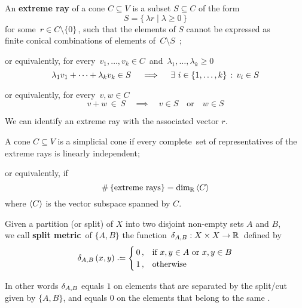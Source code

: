\documentclass[./main.tex]{subfiles}
\begin{document}
\begin{definition}
    An \textbf{extreme ray} of a cone $C \subseteq V$ is a subset $S \subseteq C$ of the form
    \[ S = \{\, \lambda r \mathrel{|} \lambda \geq 0 \,\} \]
    for some $\, r \in C \setminus \{0\} \,$, such that the elements of $S$ cannot be expressed as \\
    finite conical combinations of elements of $\, C \setminus S \,$ ;
    
    or equivalently, for every $\, v_1, \dots, v_k \in C \,$ and $\, \lambda_1, \dots, \lambda_k \geq 0 \,$
    \[ \lambda_1 v_1 + \dots + \lambda_k v_k \in S \quad \implies \quad \exists\ i \in \{ 1, \dots, k \} \,:\, v_i \in S \nospblw \]
    
    or equivalently, for every $\, v,w \in C \,$
    \[ v + w \,\in\, S \quad \implies \quad v \in S \quad \text{or} \quad w \in S \]
\end{definition}

We can identify an extreme ray with the associated vector $r$.

\begin{definition}
    A cone $C \subseteq V$ is a simplicial cone if every complete\footnotemark\ set of representatives of the extreme rays is linearly independent;
    
    or equivalently, if
    \[ \#\,\{\text{extreme rays}\} = \dim_{\mathbb{R}} \left\langle C\right\rangle \]
    where $\left\langle C\right\rangle$ is the vector subspace spanned by $C$.
    
\end{definition}

\clearpage

\begin{definition}
    Given a partition (or split) of $X$ into two disjoint non-empty sets $A$ and $B$, \\[2pt]
    we call \textbf{split metric}\footnotemark\ of $\{A,B\}$ the function $\, \delta_{A,B} : {X \times X} \to \mathbb{R} \,$ defined by
    \[ \dAB\,(x,y) \defeq
        \begin{cases}
        \, 0 \,,    & \text{if}\ x,y \in A\ \text{or}\ x,y \in B \\
        \, 1 \,,    & \text{otherwise}
        \end{cases} \nospblw \]
    
\end{definition}
In other words $\delta_{A,B}$ equals $1$ on elements that are separated by the split/cut \\[2pt]
given by $\{A,B\}$, and equals $0$ on the elements that belong to the same .
\end{document}

